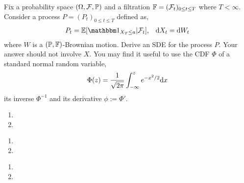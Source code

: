 \begin{problem}
    Fix a probability space \( (\Omega, \mathcal{F}, \mathbb{P}) \) and a filtration \( \mathbb{F} = (\mathcal{F}_t)_{0\leq t\leq T} \) where \( T< \infty \). Consider a process \( P = (P_t)_{0\leq t\leq T} \) defined as,
    \begin{align*}
        P_t = \EE[\bOne_{X_T\leq a} | \cF_t], && \d X_t = \d W_t
    \end{align*}
    where \( W \) is a \( (\mathbb{P},\mathbb{F}) \)-Brownian motion. Derive an SDE for the process \( P \). Your answer should not involve \( X \). You may find it useful to use the CDF \( \Phi \) of a standard normal random variable,
    \begin{align*}
        \Phi(z) = \frac{1}{\sqrt{2\pi}} \int_{-\infty}^{z} e^{-x^2/2}\mathrm{d} x
    \end{align*}
    its inverse \( \Phi^{-1} \) and its derivative \( \phi:= \Phi' \).
\end{problem}

\begin{solution}[Solution]

\end{solution}



\begin{solution}[Solution]
\begin{enumerate}[label=(\alph*)]
    \item 
    \item 
\end{enumerate}
\end{solution}


\begin{problem}

\end{problem}

\begin{solution}[Solution]
\begin{enumerate}[label=(\alph*)]
    \item 
    \item 
\end{enumerate}
\end{solution}


\begin{problem}

\end{problem}

\begin{solution}[Solution]
\begin{enumerate}[label=(\alph*)]
    \item 
    \item 
\end{enumerate}
\end{solution}

